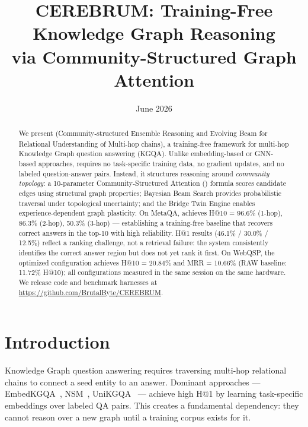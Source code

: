 \documentclass[10pt,twocolumn]{article}
\title{\textbf{CEREBRUM: Training-Free Knowledge Graph Reasoning\\via Community-Structured Graph Attention}}
\date{June 2026}
\begin{document}
\maketitle

\begin{abstract}
We present \textbf{\CEREBRUM{}} (Community-structured Ensemble Reasoning and Evolving
Beam for Relational Understanding of Multi-hop chains), a training-free framework for
multi-hop Knowledge Graph question answering (\textsc{KGQA}). Unlike embedding-based
or GNN-based approaches, \CEREBRUM{} requires no task-specific training data, no
gradient updates, and no labeled question-answer pairs. Instead, it structures reasoning
around \emph{community topology}: a 10-parameter Community-Structured Attention (\CSA{})
formula scores candidate edges using structural graph properties; Bayesian Beam Search
provides probabilistic traversal under topological uncertainty; and the Bridge Twin Engine
enables experience-dependent graph plasticity. On MetaQA, \CEREBRUM{} achieves
H@10 = 96.6\% (1-hop), 86.3\% (2-hop), 50.3\% (3-hop) — establishing a training-free
baseline that recovers correct answers in the top-10 with high reliability. H@1 results
(46.1\% / 30.0\% / 12.5\%) reflect a ranking challenge, not a retrieval failure: the
system consistently identifies the correct answer region but does not yet rank it first.
On WebQSP, the optimized configuration achieves H@10 = 20.84\% and MRR = 10.66\%
(RAW baseline: 11.72\% H@10); all configurations measured in the same session on
the same hardware. We release code and benchmark harnesses at
\url{https://github.com/BrutalByte/CEREBRUM}.
\end{abstract}

\section{Introduction}
\label{sec:intro}

Knowledge Graph question answering requires traversing multi-hop relational chains to
connect a seed entity to an answer. Dominant approaches — EmbedKGQA~\cite{saxena2020improve},
NSM~\cite{he2021}, UniKGQA~\cite{jiang2023} — achieve high H@1 by learning
task-specific embeddings over labeled QA pairs. This creates a fundamental dependency:
they cannot reason over a new graph until a training corpus exists for it.
\end{document}
